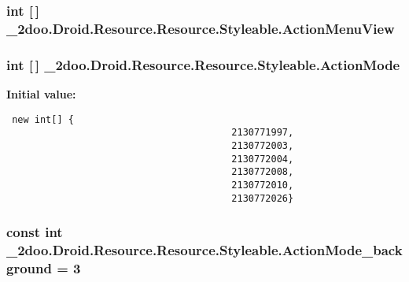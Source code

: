 \hypertarget{class__2doo_1_1_droid_1_1_resource_1_1_styleable_89d93022ff0483ccff9309186df4e1bb}{
\subsubsection[{ActionMenuView}]{\setlength{\rightskip}{0pt plus 5cm}int \mbox{[}$\,$\mbox{]} \_\-2doo.Droid.Resource.Resource.Styleable.ActionMenuView}}
\label{class__2doo_1_1_droid_1_1_resource_1_1_styleable_89d93022ff0483ccff9309186df4e1bb}


\hypertarget{class__2doo_1_1_droid_1_1_resource_1_1_styleable_84b41a0b766f36a87cbf0e180332e4c1}{
\subsubsection[{ActionMode}]{\setlength{\rightskip}{0pt plus 5cm}int \mbox{[}$\,$\mbox{]} \_\-2doo.Droid.Resource.Resource.Styleable.ActionMode}}
\label{class__2doo_1_1_droid_1_1_resource_1_1_styleable_84b41a0b766f36a87cbf0e180332e4c1}


\textbf{Initial value:}

\begin{Code}\begin{verbatim} new int[] {
                                        2130771997,
                                        2130772003,
                                        2130772004,
                                        2130772008,
                                        2130772010,
                                        2130772026}
\end{verbatim}
\end{Code}
\hypertarget{class__2doo_1_1_droid_1_1_resource_1_1_styleable_63e7605856e3505f2633019bea5498b7}{
\subsubsection[{ActionMode\_\-background}]{\setlength{\rightskip}{0pt plus 5cm}const int \_\-2doo.Droid.Resource.Resource.Styleable.ActionMode\_\-background = 3}}
\label{class__2doo_1_1_droid_1_1_resource_1_1_styleable_63e7605856e3505f2633019bea5498b7}


